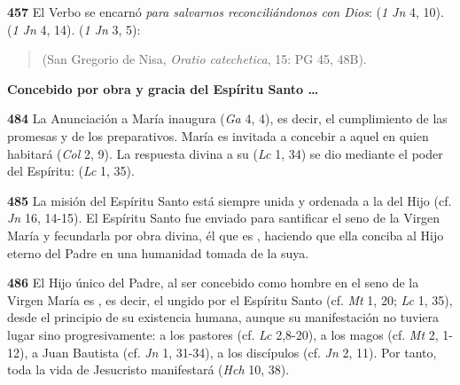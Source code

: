 \textbf{457} El Verbo se encarnó \emph{para salvarnos reconciliándonos con Dios}:  (\emph{1 Jn} 4, 10).  (\emph{1 Jn} 4, 14).  (\emph{1 Jn} 3, 5):

\begin{quote}  (San Gregorio de Nisa, \emph{Oratio catechetica}, 15: PG 45, 48B). \end{quote}

\textbf{Concebido por obra y gracia del Espíritu Santo \ldots{}}

\textbf{484} La Anunciación a María inaugura  (\emph{Ga} 4, 4), es decir, el cumplimiento de las promesas y de los preparativos. María es invitada a concebir a aquel en quien habitará  (\emph{Col} 2, 9). La respuesta divina a su  (\emph{Lc} 1, 34) se dio mediante el poder del Espíritu:  (\emph{Lc} 1, 35).

\textbf{485} La misión del Espíritu Santo está siempre unida y ordenada a la del Hijo (cf. \emph{Jn} 16, 14-15). El Espíritu Santo fue enviado para santificar el seno de la Virgen María y fecundarla por obra divina, él que es , haciendo que ella conciba al Hijo eterno del Padre en una humanidad tomada de la suya.

\textbf{486} El Hijo único del Padre, al ser concebido como hombre en el seno de la Virgen María es , es decir, el ungido por el Espíritu Santo (cf. \emph{Mt} 1, 20; \emph{Lc} 1, 35), desde el principio de su existencia humana, aunque su manifestación no tuviera lugar sino progresivamente: a los pastores (cf. \emph{Lc} 2,8-20), a los magos (cf. \emph{Mt} 2, 1-12), a Juan Bautista (cf. \emph{Jn} 1, 31-34), a los discípulos (cf. \emph{Jn} 2, 11). Por tanto, toda la vida de Jesucristo manifestará  (\emph{Hch} 10, 38).

